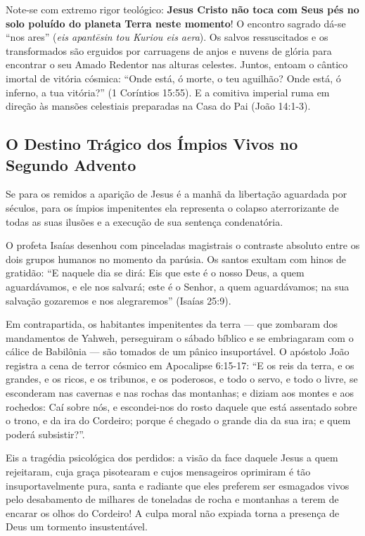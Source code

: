 Note-se com extremo rigor teológico: \textbf{Jesus Cristo não toca com Seus pés no solo poluído do planeta Terra neste momento}! O encontro sagrado dá-se ``nos ares'' (\textit{eis apantēsin tou Kuriou eis aera}). Os salvos ressuscitados e os transformados são erguidos por carruagens de anjos e nuvens de glória para encontrar o seu Amado Redentor nas alturas celestes. Juntos, entoam o cântico imortal de vitória cósmica: ``Onde está, ó morte, o teu aguilhão? Onde está, ó inferno, a tua vitória?'' (1 Coríntios 15:55). E a comitiva imperial ruma em direção às mansões celestiais preparadas na Casa do Pai (João 14:1-3).



\subsection{O Destino Trágico dos Ímpios Vivos no Segundo Advento}


Se para os remidos a aparição de Jesus é a manhã da libertação aguardada por séculos, para os ímpios impenitentes ela representa o colapso aterrorizante de todas as suas ilusões e a execução de sua sentença condenatória.

O profeta Isaías desenhou com pinceladas magistrais o contraste absoluto entre os dois grupos humanos no momento da parúsia.
Os santos exultam com hinos de gratidão:
``E naquele dia se dirá: Eis que este é o nosso Deus, a quem aguardávamos, e ele nos salvará; este é o Senhor, a quem aguardávamos; na sua salvação gozaremos e nos alegraremos'' (Isaías 25:9).

Em contrapartida, os habitantes impenitentes da terra — que zombaram dos mandamentos de Yahweh, perseguiram o sábado bíblico e se embriagaram com o cálice de Babilônia — são tomados de um pânico insuportável. O apóstolo João registra a cena de terror cósmico em Apocalipse 6:15-17:
``E os reis da terra, e os grandes, e os ricos, e os tribunos, e os poderosos, e todo o servo, e todo o livre, se esconderam nas cavernas e nas rochas das montanhas; e diziam aos montes e aos rochedos: Caí sobre nós, e escondei-nos do rosto daquele que está assentado sobre o trono, e da ira do Cordeiro; porque é chegado o grande dia da sua ira; e quem poderá subsistir?''.

Eis a tragédia psicológica dos perdidos: a visão da face daquele Jesus a quem rejeitaram, cuja graça pisotearam e cujos mensageiros oprimiram é tão insuportavelmente pura, santa e radiante que eles preferem ser esmagados vivos pelo desabamento de milhares de toneladas de rocha e montanhas a terem de encarar os olhos do Cordeiro! A culpa moral não expiada torna a presença de Deus um tormento insustentável.

